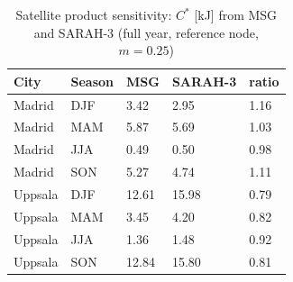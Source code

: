\begin{table}[H]\centering\footnotesize\caption{Satellite product sensitivity: $C^*$ [kJ] from MSG and SARAH-3 (full year, reference node, $m=0.25$)}\label{tab:s_products}
\begin{tabular}{@{}lllll@{}}\toprule
City & Season & MSG & SARAH-3 & ratio\\\midrule
Madrid & DJF & 3.42 & 2.95 & 1.16\\
Madrid & MAM & 5.87 & 5.69 & 1.03\\
Madrid & JJA & 0.49 & 0.50 & 0.98\\
Madrid & SON & 5.27 & 4.74 & 1.11\\
Uppsala & DJF & 12.61 & 15.98 & 0.79\\
Uppsala & MAM & 3.45 & 4.20 & 0.82\\
Uppsala & JJA & 1.36 & 1.48 & 0.92\\
Uppsala & SON & 12.84 & 15.80 & 0.81\\
\bottomrule\end{tabular}\end{table}

